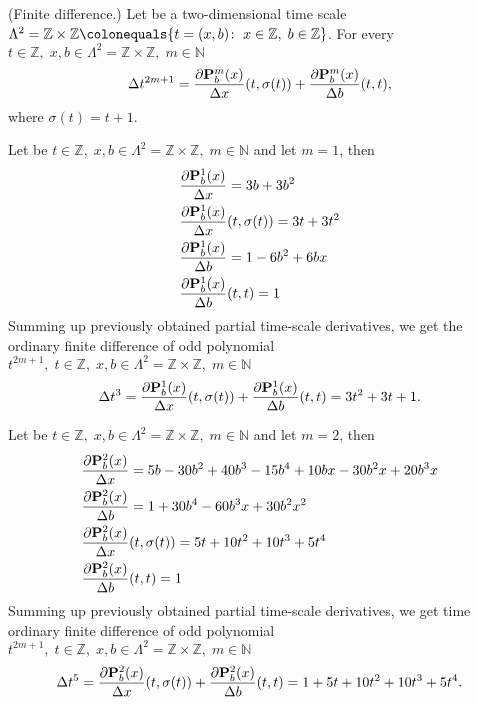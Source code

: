 \begin{cor}
    \label{finite_difference_case}
    (Finite difference.)
    Let be a two-dimensional time scale
    $\Lambda^2 = \mathbb{Z} \times \mathbb{Z} \colonequals \{t=(x, b) \colon \; x\in \mathbb{Z}, \; b\in \mathbb{Z} \}$.
    For every $t\in\mathbb{Z}, \; x,b\in \Lambda^2 = \mathbb{Z} \times \mathbb{Z}, \; m\in\mathbb{N}$
    \[
        \Delta t^{2m+1}
        = \frac{\partial {\mathbf{P}}\sp{m} \sb{b}(x)}{\Delta x}(t, \sigma(t))
        + \frac{\partial {\mathbf{P}}\sp{m} \sb{b}(x)}{\Delta b}(t, t),
    \]
    where $\sigma(t) = t+1$.
\end{cor}
\begin{examp}
    Let be $t\in\mathbb{Z}, \;x,b\in\Lambda^2 = \mathbb{Z} \times \mathbb{Z}, \; m\in\mathbb{N}$ and let $m=1$, then
    \begin{align*}
        &\frac{\partial {\mathbf{P}}\sp{1} \sb{b}(x)}{\Delta x} = 3 b + 3 b^2 \\
        &\frac{\partial {\mathbf{P}}\sp{1} \sb{b}(x)}{\Delta x}(t, \sigma(t)) = 3 t + 3 t^2\\
        &\frac{\partial {\mathbf{P}}\sp{1} \sb{b}(x)}{\Delta b}= 1 - 6 b^2 + 6 b x\\
        &\frac{\partial {\mathbf{P}}\sp{1} \sb{b}(x)}{\Delta b}(t, t) = 1
    \end{align*}
    Summing up previously obtained partial time-scale derivatives, we get the ordinary finite difference of odd polynomial
    $t^{2m+1}, \; t\in\mathbb{Z}, \; x,b\in\Lambda^2 = \mathbb{Z} \times \mathbb{Z}, \; m\in\mathbb{N}$
    \[
        \Delta t^{3}
        = \frac{\partial {\mathbf{P}}\sp{1} \sb{b}(x)}{\Delta x}(t, \sigma(t)) + \frac{\partial {\mathbf{P}}\sp{1} \sb{b}(x)}{\Delta b}(t, t)
        = 3 t^2 + 3 t + 1.
    \]
\end{examp}
\begin{examp}
    Let be $t\in\mathbb{Z}, \;x,b\in\Lambda^2 = \mathbb{Z} \times \mathbb{Z}, \; m\in\mathbb{N}$
    and let $m=2$, then
    \begin{align*}
        &\frac{\partial {\mathbf{P}}\sp{2} \sb{b}(x)}{\Delta x} = 5 b - 30 b^2 + 40 b^3 - 15 b^4 + 10 b x - 30 b^2 x + 20 b^3 x \\
        &\frac{\partial {\mathbf{P}}\sp{2} \sb{b}(x)}{\Delta b} = 1 + 30 b^4 - 60 b^3 x + 30 b^2 x^2 \\
        &\frac{\partial {\mathbf{P}}\sp{2} \sb{b}(x)}{\Delta x}(t, \sigma(t)) = 5 t + 10 t^2 + 10 t^3 + 5 t^4 \\
        &\frac{\partial {\mathbf{P}}\sp{2} \sb{b}(x)}{\Delta b}(t, t) = 1
    \end{align*}
    Summing up previously obtained partial time-scale derivatives, we get time ordinary finite difference of odd polynomial
    $t^{2m+1}, \; t\in\mathbb{Z}, \;x,b\in\Lambda^2 = \mathbb{Z} \times \mathbb{Z}, \; m\in\mathbb{N}$
    \[
        \Delta t^{5}
        = \frac{\partial {\mathbf{P}}\sp{2} \sb{b}(x)}{\Delta x}(t, \sigma(t)) + \frac{\partial {\mathbf{P}}\sp{2} \sb{b}(x)}{\Delta b}(t, t)
        = 1 + 5 t + 10 t^2 + 10 t^3 + 5 t^4.
    \]
\end{examp}
